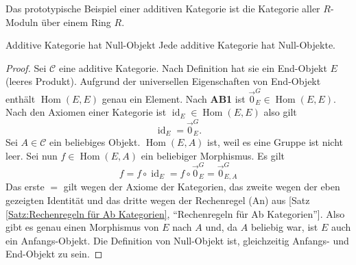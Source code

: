 \documentclass[a4paper]{amsart}
\theoremstyle{definition}
\newcommand{\myRef}[2]{[#1 \ref{#1:#2}, ``#2'']}
\DeclareMathOperator{\id}{id}
\DeclareMathOperator{\Hom}{Hom}
\newcommand{\CC}{\ensuremath{\mathcal{ C }}}
\begin{document}
Das prototypische Beispiel einer additiven Kategorie ist die Kategorie aller $R$-Moduln über einem  Ring $R$.

\begin{Satz}{Additive Kategorie hat Null-Objekt}
   Jede additive Kategorie hat Null-Objekte.
\end{Satz}
\begin{proof}
   Sei $\CC$ eine additive Kategorie. Nach Definition hat sie ein End-Objekt $E$ (leeres Produkt). Aufgrund der universellen Eigenschaften von End-Objekt enthält $\Hom( E, E)$ genau ein Element. Nach \textbf{AB1} ist $\vec 0^G_E \in \Hom( E, E)$. Nach den Axiomen einer Kategorie ist $\id_E \in \Hom( E, E)$ also gilt
   \begin{equation}
      \id_E = \vec 0^G_E.
   \end{equation}
   Sei $A \in \CC$ ein beliebiges Objekt. $\Hom( E, A)$ ist, weil es eine Gruppe ist nicht leer. Sei nun $f \in \Hom( E, A)$ ein beliebiger Morphismus. Es gilt
   \begin{equation}
      f = f \circ \id_E  = f \circ \vec 0^G_E = \vec 0^G_{E, A}
   \end{equation}
   Das erste $=$ gilt wegen der Axiome der Kategorien, das zweite wegen der eben gezeigten Identität und das dritte wegen der Rechenregel (An) aus \myRef{Satz}{Rechenregeln für Ab Kategorien}. Also gibt es genau einen Morphismus von $E$ nach $A$ und, da $A$ beliebig war, ist $E$ auch ein Anfangs-Objekt. Die Definition von Null-Objekt ist, gleichzeitig Anfangs- und End-Objekt zu sein.
\end{proof}

\end{document}
